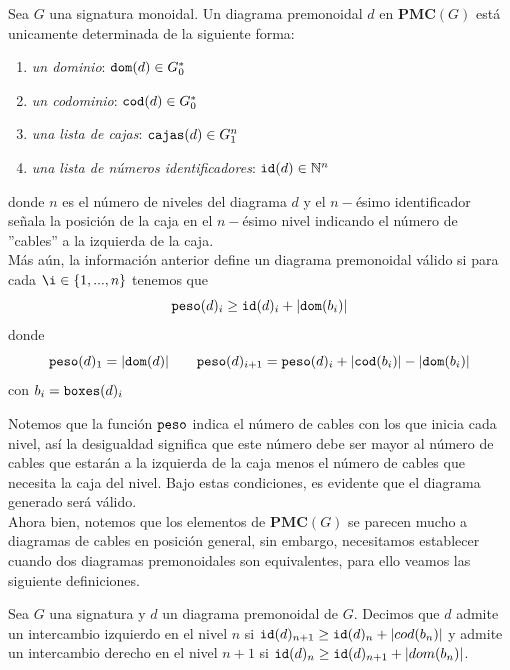 \documentclass[../main.tex]{subfiles}
\begin{document}
\begin{prop}
	Sea $G$ una signatura monoidal. Un diagrama premonoidal $d$ en $\textbf{PMC}(G)$ está unicamente determinada de la siguiente forma:
	\begin{enumerate}
		\item \textit{un dominio}: ${\tt{dom}}(d) \in G_0^*$
		\item \textit{un codominio}: ${\tt{cod}}(d) \in G_0^*$
		\item \textit{una lista de cajas}: ${\tt{cajas}}(d) \in G_1^n$
		\item \textit{una lista de números identificadores}: ${\tt{id}}(d) \in \mathbb{N}^n$
	\end{enumerate}
	donde $n$ es el número de niveles del diagrama $d$ y el $n-$ésimo identificador señala la posición de la caja en el $n-$ésimo nivel indicando el número de ''cables'' a la izquierda de la caja. \\
	Más aún, la información anterior define un diagrama premonoidal válido si para cada $\i \in \{ 1, ..., n\}$ tenemos que
	$${\tt{peso}}(d)_i \geq {\tt{id}}(d)_i + |{\tt{dom}}(b_i)|$$
	donde
	\begin{equation*}
		{\tt{peso}}(d)_1 = 	|{\tt{dom}}(d)| \quad \quad  {\tt{peso}}(d)_{i+1}= {\tt{peso}}(d)_i + |{\tt{cod}}(b_i)| - |{\tt{dom}}(b_i)| 
	\end{equation*}
	con $b_i={\tt{boxes}}(d)_i$
\end{prop}

Notemos que la función $\tt{peso}$ indica el número de cables con los que inicia cada nivel, así la desigualdad significa que este número debe ser mayor al número de cables que estarán a la izquierda de la caja menos el número de cables que necesita la caja del nivel. Bajo estas condiciones, es evidente que el diagrama generado será válido.  \\

Ahora bien, notemos que los elementos de $\textbf{PMC}(G)$ se parecen mucho a diagramas de cables en posición general, sin embargo, necesitamos establecer cuando dos diagramas premonoidales son equivalentes, para ello veamos las siguiente definiciones.

\begin{dfn}
	Sea $G$ una signatura y $d$ un diagrama premonoidal de $G$. Decimos que $d$ admite un intercambio izquierdo en el nivel $n$ si ${\tt{id}}(d)_{n+1} \geq {\tt{id}}(d)_{n} + |cod(b_n)|$ y admite un intercambio derecho en el nivel $n+1$ si ${\tt{id}}(d)_{n} \geq {\tt{id}}(d)_{n+1} + |dom(b_n)|$.
\end{dfn}
\end{document}
